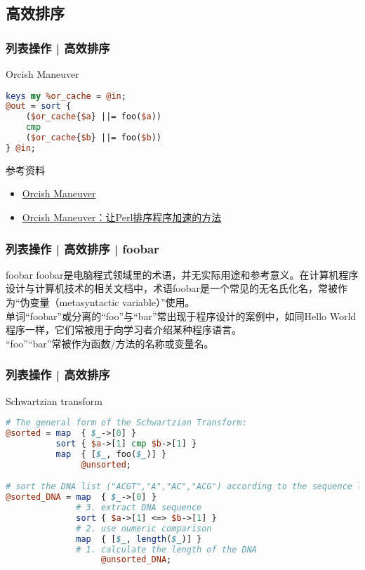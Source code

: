 \subsection{高效排序}
\begin{frame}[fragile]
  \frametitle{列表操作 | 高效排序}
  \begin{block}{Orcish Maneuver}
    \vspace{-1em}
\begin{lstlisting}[language=Perl]
keys my %or_cache = @in;
@out = sort {
    ($or_cache{$a} ||= foo($a))
    cmp
    ($or_cache{$b} ||= foo($b))
} @in;
\end{lstlisting}
  \end{block}
  \begin{block}{参考资料}
    \begin{itemize}
      \item \href{https://www.perlmonks.org/?node=130021}{Orcish Maneuver}
      \item \href{https://blog.gtwang.org/perl/orcish-maneuver-perl-sorting/}{Orcish Maneuver：让Perl排序程序加速的方法}
    \end{itemize}
  \end{block}
\end{frame}

\begin{frame}[fragile]
  \frametitle{列表操作 | 高效排序 | foobar}
  \begin{block}{foobar}
foobar是电脑程式领域里的术语，并无实际用途和参考意义。在计算机程序设计与计算机技术的相关文档中，术语foobar是一个常见的无名氏化名，常被作为“伪变量（metasyntactic variable）”使用。\\
\vspace{0.5em}
单词“foobar”或分离的“foo”与“bar”常出现于程序设计的案例中，如同Hello World程序一样，它们常被用于向学习者介绍某种程序语言。\\
\vspace{0.5em}
“foo”“bar”常被作为函数/方法的名称或变量名。
  \end{block}
\end{frame}

\begin{frame}[fragile]
  \frametitle{列表操作 | 高效排序}
  \begin{block}{\alert{Schwartzian transform}}
    \vspace{-1em}
\begin{lstlisting}[language=Perl,basicstyle=\small\tt]
# The general form of the Schwartzian Transform:
@sorted = map  { $_->[0] }
          sort { $a->[1] cmp $b->[1] }
          map  { [$_, foo($_)] }
               @unsorted;

# sort the DNA list ("ACGT","A","AC","ACG") according to the sequence length
@sorted_DNA = map  { $_->[0] }
              # 3. extract DNA sequence
              sort { $a->[1] <=> $b->[1] }
              # 2. use numeric comparison
              map  { [$_, length($_)] }
              # 1. calculate the length of the DNA
                   @unsorted_DNA;
\end{lstlisting}
  \end{block}
\end{frame}

